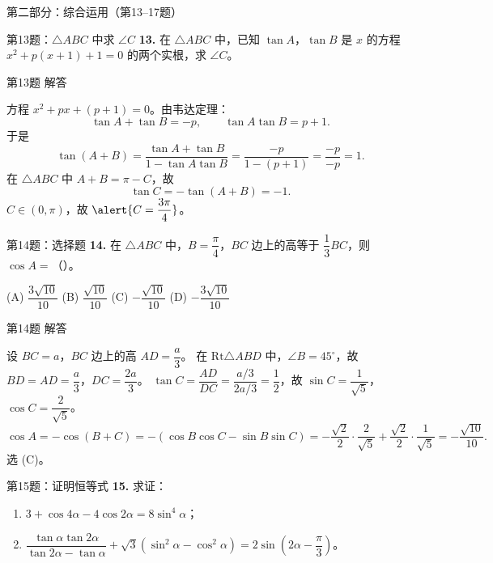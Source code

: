 \documentclass[10pt,aspectratio=169,serif]{beamer}
\begin{document}
\begin{frame}{第二部分：综合运用（第13--17题）}
\end{frame}

\begin{frame}[t]{第13题：$\triangle ABC$ 中求 $\angle C$}
\textbf{13.} 在 $\triangle ABC$ 中，已知 $\tan A$，$\tan B$ 是 $x$ 的方程 $x^2+p(x+1)+1=0$ 的两个实根，求 $\angle C$。
\end{frame}

\begin{frame}[t]{第13题 解答}
\begin{tcolorbox}[colback=orange!10,colframe=orange,title=\textbf{解}]
方程 $x^2+px+(p+1)=0$。由韦达定理：
\[
\tan A+\tan B=-p,\qquad \tan A\tan B=p+1.
\]
于是
\[
\tan(A+B)=\frac{\tan A+\tan B}{1-\tan A\tan B}=\frac{-p}{1-(p+1)}=\frac{-p}{-p}=1.
\]
在 $\triangle ABC$ 中 $A+B=\pi-C$，故
\[
\tan C=-\tan(A+B)=-1.
\]
$C\in(0,\pi)$，故 $\alert{C=\dfrac{3\pi}{4}}$。
\end{tcolorbox}
\end{frame}

\begin{frame}[t]{第14题：选择题}
\textbf{14.} 在 $\triangle ABC$ 中，$B=\dfrac{\pi}{4}$，$BC$ 边上的高等于 $\dfrac13 BC$，则 $\cos A=$（\quad）。

(A) $\dfrac{3\sqrt{10}}{10}$\quad
(B) $\dfrac{\sqrt{10}}{10}$\quad
(C) $-\dfrac{\sqrt{10}}{10}$\quad
(D) $-\dfrac{3\sqrt{10}}{10}$
\end{frame}

\begin{frame}[t]{第14题 解答}
\begin{tcolorbox}[colback=orange!10,colframe=orange,title=\textbf{解}]
设 $BC=a$，$BC$ 边上的高 $AD=\dfrac{a}{3}$。
在 $\text{Rt}\triangle ABD$ 中，$\angle B=45^\circ$，故 $BD=AD=\dfrac{a}{3}$，$DC=\dfrac{2a}{3}$。
$\tan C=\dfrac{AD}{DC}=\dfrac{a/3}{2a/3}=\dfrac12$，故 $\sin C=\dfrac{1}{\sqrt5}$，$\cos C=\dfrac{2}{\sqrt5}$。
\[
\cos A=-\cos(B+C)=-(\cos B\cos C-\sin B\sin C)
=-\frac{\sqrt2}{2}\cdot\frac{2}{\sqrt5}+\frac{\sqrt2}{2}\cdot\frac{1}{\sqrt5}
=-\frac{\sqrt{10}}{10}.
\]
\alert{选 (C)}。
\end{tcolorbox}
\end{frame}

\begin{frame}[t]{第15题：证明恒等式}
\textbf{15.} 求证：
\begin{enumerate}
  \item $3+\cos 4\alpha-4\cos 2\alpha=8\sin^4\alpha$；
  \item $\dfrac{\tan\alpha\tan 2\alpha}{\tan 2\alpha-\tan\alpha}+\sqrt3(\sin^2\alpha-\cos^2\alpha)=2\sin\!\left(2\alpha-\dfrac{\pi}{3}\right)$。
\end{enumerate}
\end{frame}
\end{document}
